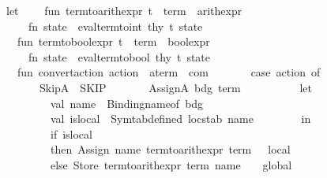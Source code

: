 \begin{isabellebody}
\ \ let\isanewline
\ \ \ \ fun\ term{\isacharunderscore}{\kern0pt}to{\isacharunderscore}{\kern0pt}arith{\isacharunderscore}{\kern0pt}expr\ {\isacharparenleft}{\kern0pt}t\ {\isacharcolon}{\kern0pt}\ term{\isacharparenright}{\kern0pt}\ {\isacharcolon}{\kern0pt}\ arith{\isacharunderscore}{\kern0pt}expr\ {\isacharequal}{\kern0pt}\ \isanewline
\ \ \ \ \ \ fn\ state\ {\isacharequal}{\kern0pt}{\isachargreater}{\kern0pt}\ eval{\isacharunderscore}{\kern0pt}term{\isacharunderscore}{\kern0pt}to{\isacharunderscore}{\kern0pt}int\ thy\ t\ state\isanewline
\ \ \ \ \isanewline
\ \ \ \ fun\ term{\isacharunderscore}{\kern0pt}to{\isacharunderscore}{\kern0pt}bool{\isacharunderscore}{\kern0pt}expr\ {\isacharparenleft}{\kern0pt}t\ {\isacharcolon}{\kern0pt}\ term{\isacharparenright}{\kern0pt}\ {\isacharcolon}{\kern0pt}\ bool{\isacharunderscore}{\kern0pt}expr\ {\isacharequal}{\kern0pt}\isanewline
\ \ \ \ \ \ fn\ state\ {\isacharequal}{\kern0pt}{\isachargreater}{\kern0pt}\ eval{\isacharunderscore}{\kern0pt}term{\isacharunderscore}{\kern0pt}to{\isacharunderscore}{\kern0pt}bool\ thy\ t\ state\isanewline
\ \ \ \ \isanewline
\ \ \ \ fun\ convert{\isacharunderscore}{\kern0pt}action\ {\isacharparenleft}{\kern0pt}action\ {\isacharcolon}{\kern0pt}\ a{\isacharunderscore}{\kern0pt}term{\isacharparenright}{\kern0pt}\ {\isacharcolon}{\kern0pt}\ com\ {\isacharequal}{\kern0pt}\isanewline
\ \ \ \ \ \ case\ action\ of\isanewline
\ \ \ \ \ \ \ \ SkipA\ {\isacharequal}{\kern0pt}{\isachargreater}{\kern0pt}\ SKIP\isanewline
\ \ \ \ \ \ {\isacharbar}{\kern0pt}\ AssignA\ {\isacharparenleft}{\kern0pt}bdg{\isacharcomma}{\kern0pt}\ term{\isacharparenright}{\kern0pt}\ {\isacharequal}{\kern0pt}{\isachargreater}{\kern0pt}\ \isanewline
\ \ \ \ \ \ \ \ let\isanewline
\ \ \ \ \ \ \ \ \ \ val\ name\ {\isacharequal}{\kern0pt}\ Binding{\isachardot}{\kern0pt}name{\isacharunderscore}{\kern0pt}of\ bdg\isanewline
\ \ \ \ \ \ \ \ \ \ val\ is{\isacharunderscore}{\kern0pt}local\ {\isacharequal}{\kern0pt}\ Symtab{\isachardot}{\kern0pt}defined\ locstab\ name\isanewline
\ \ \ \ \ \ \ \ in\isanewline
\ \ \ \ \ \ \ \ \ \ if\ is{\isacharunderscore}{\kern0pt}local\isanewline
\ \ \ \ \ \ \ \ \ \ then\ Assign\ {\isacharparenleft}{\kern0pt}name{\isacharcomma}{\kern0pt}\ term{\isacharunderscore}{\kern0pt}to{\isacharunderscore}{\kern0pt}arith{\isacharunderscore}{\kern0pt}expr\ term{\isacharparenright}{\kern0pt}\ \ {\isacharparenleft}{\kern0pt}{\isacharasterisk}{\kern0pt}\ local\ {\isacharasterisk}{\kern0pt}{\isacharparenright}{\kern0pt}\isanewline
\ \ \ \ \ \ \ \ \ \ else\ Store\ {\isacharparenleft}{\kern0pt}term{\isacharunderscore}{\kern0pt}to{\isacharunderscore}{\kern0pt}arith{\isacharunderscore}{\kern0pt}expr\ term{\isacharcomma}{\kern0pt}\ name{\isacharparenright}{\kern0pt}\ \ \ {\isacharparenleft}{\kern0pt}{\isacharasterisk}{\kern0pt}\ global\ {\isacharasterisk}{\kern0pt}{\isacharparenright}{\kern0pt}\isanewline

\end{isabellebody}
